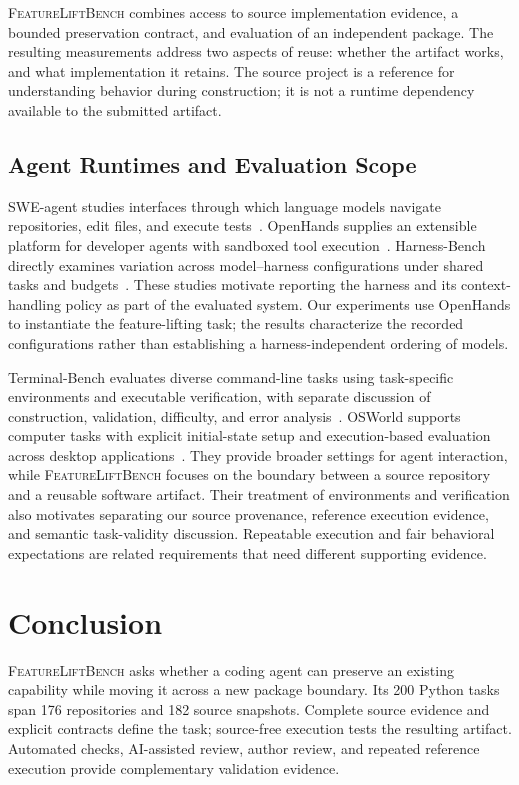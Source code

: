 \documentclass[acmsmall,screen,review,anonymous,nonacm]{acmart}
\newcommand{\flb}{\textsc{FeatureLiftBench}\xspace}
\begin{document}
\flb combines access to source implementation evidence, a bounded preservation
contract, and evaluation of an independent package. The resulting measurements
address two aspects of reuse: whether the artifact works, and what implementation
it retains. The source project is a reference for understanding behavior during
construction; it is not a runtime dependency available to the submitted artifact.

\subsection{Agent Runtimes and Evaluation Scope}

SWE-agent studies interfaces through which language models navigate repositories,
edit files, and execute tests~\cite{yang2024sweagent}. OpenHands supplies an
extensible platform for developer agents with sandboxed tool
execution~\cite{wang2025openhands}. Harness-Bench directly examines variation
across model--harness configurations under shared tasks and
budgets~\cite{yao2026harnessbench}. These studies motivate reporting the harness
and its context-handling policy as part of the evaluated system. Our experiments
use OpenHands to instantiate the feature-lifting task; the results characterize
the recorded configurations rather than establishing a harness-independent
ordering of models.

Terminal-Bench evaluates diverse command-line tasks using task-specific
environments and executable verification, with separate discussion of
construction, validation, difficulty, and error
analysis~\cite{merrill2026terminalbench}. OSWorld supports computer tasks with
explicit initial-state setup and execution-based evaluation across desktop
applications~\cite{xie2024osworld}. They provide broader settings for agent
interaction, while \flb focuses on the boundary between a source repository and
a reusable software artifact. Their treatment of environments and verification
also motivates separating our source provenance, reference execution evidence,
and semantic task-validity discussion. Repeatable execution and fair behavioral
expectations are related requirements that need different supporting evidence.

\section{Conclusion}

\flb asks whether a coding agent can preserve an existing capability while
moving it across a new package boundary. Its 200 Python tasks span 176
repositories and 182 source snapshots. Complete source evidence and explicit
contracts define the task; source-free execution tests the resulting artifact.
Automated checks, AI-assisted review, author review, and repeated
reference execution provide complementary validation evidence.
\end{document}
